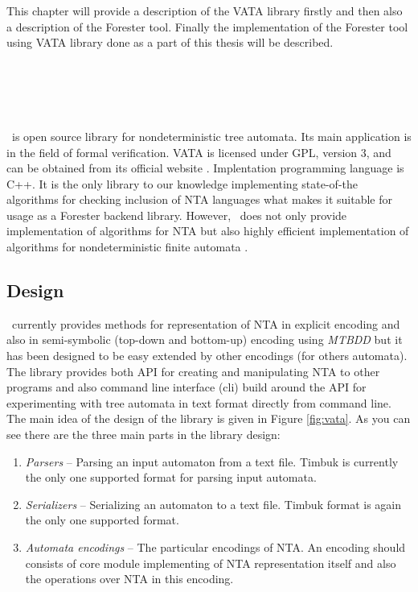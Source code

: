 This chapter will provide a description of the VATA library firstly and then also a description of the Forester tool.
Finally the implementation of the Forester tool using VATA library done as a part of this thesis will be described.

\section{\vata\ }
\label{sec:VATA}

\vata\ is open source library for nondeterministic tree automata.
Its main application is in the field of formal verification.
VATA is licensed under GPL, version 3, and can be obtained from its official website \cite{www:vata}.
Implentation programming language is C++.
It is the only library to our knowledge implementing state-of-the algorithms for checking inclusion of NTA languages
what makes it suitable for usage as a Forester backend library.
However, \vata\ does not only provide implementation of algorithms for NTA but also highly efficient implementation of
algorithms for nondeterministic finite automata \cite{hruska13}.

\subsection{Design}
\vata\ currently provides methods for representation of NTA in explicit encoding and also in semi-symbolic (top-down and bottom-up)
encoding using \emph{MTBDD} but it has been designed to be easy extended by other encodings (for others automata).
The library provides both API for creating and manipulating NTA to other programs and also command line interface (cli) build around
the API for experimenting with tree automata in text format directly from command line.
The main idea of the design of the library is given in Figure \ref{fig:vata}.
As you can see there are the three main parts in the library design:
\begin{enumerate}
	\item \emph{Parsers} -- Parsing an input automaton from a text file.
		Timbuk \cite{timbuk} is currently the only one supported format for parsing input automata.
	\item \emph{Serializers} -- Serializing an automaton to a text file.
		Timbuk format is again the only one supported format.
	\item \emph{Automata encodings} -- The particular encodings of NTA.
		An encoding should consists of core module implementing of NTA representation itself
		and also the operations over NTA in this encoding.
\end{enumerate}

